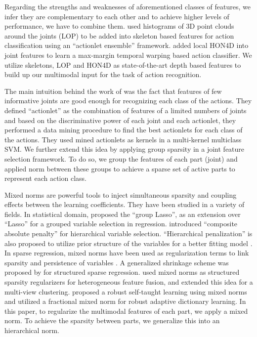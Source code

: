 \documentclass[9pt,technote,compsoc]{IEEEtran}
\begin{document}
Regarding the strengths and weaknesses of aforementioned classes of features, we infer they are complementary to each other and to achieve higher levels of performance, we have to combine them. \cite{actionletPAMI} used histograms of 3D point clouds around the joints (LOP) to be added into skeleton based features for action classification using an ``actionlet ensemble'' framework. \cite{MMTW} added local HON4D \cite{HON4D} into joint features to learn a max\--margin temporal warping based action classifier. We utilize skeletons, LOP and HON4D as state-of-the-art depth based features to build up our multimodal input for the task of action recognition.

The main intuition behind the work of \cite{actionletPAMI} was the fact that features of few informative joints are good enough for recognizing each class of the actions. They defined ``actionlet'' as the combination of features of a limited numbers of joints and based on the discriminative power of each joint and each actionlet, they performed a data mining procedure to find the best actionlets for each class of the actions. They used mined actionlets as kernels in a multi-kernel multiclass SVM. We further extend this idea by applying group sparsity in a joint feature selection framework. To do so, we group the features of each part (joint) and applied  norm between these groups to achieve a sparse set of active parts to represent each action class.

Mixed norms are powerful tools to inject simultaneous sparsity and coupling effects between the learning coefficients. They have been studied in a variety of fields. In statistical domain, \cite{groupLasso} proposed the ``group Lasso'', as an extension over ``Lasso'' \cite{Lasso} for a grouped variable selection in regression. \cite{zhao2009composite} introduced ``composite absolute penalty'' for hierarchical variable selection. ``Hierarchical penalization'' is also proposed to utilize prior structure of the variables for a better fitting model \cite{NIPS2007_3338}. In sparse regression, mixed norms have been used as regularization terms to link sparsity and persistence of variables \cite{Kowalski2009303}. A generalized shrinkage scheme was proposed by \cite{kowalski:inria-00369577} for structured sparse regression. \cite{6619242} used mixed norms as structured sparsity regularizers for heterogeneous feature fusion, and \cite{icml2013_wang13c} extended this idea for a multi-view clustering. \cite{wang2013robust} proposed a robust self-taught learning using mixed norms and \cite{Wang_2013_ICCV} utilized a fractional mixed norm for robust adaptive dictionary learning. In this paper, to regularize the multimodal features of each part, we apply a mixed  norm. To achieve the sparsity between parts, we generalize this into an  hierarchical norm.
\end{document}

